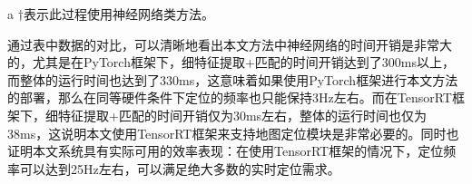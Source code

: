 \begin{table}
\centering
\begin{threeparttable}
\caption{地图定位模块的运行时间（毫秒）测试}
\label{tab:loc_efficiency}
\begin{tablenotes}
  \item [a] ${\dagger}$表示此过程使用神经网络类方法。
\end{tablenotes}
\end{threeparttable}
\end{table}

通过表中数据的对比，可以清晰地看出本文方法中神经网络的时间开销是非常大的，尤其是在PyTorch框架下，细特征提取+匹配的时间开销达到了300ms以上，而整体的运行时间也达到了330ms，这意味着如果使用PyTorch框架进行本文方法的部署，那么在同等硬件条件下定位的频率也只能保持3Hz左右。而在TensorRT框架下，细特征提取+匹配的时间开销仅为30ms左右，整体的运行时间也仅为38ms，这说明本文使用TensorRT框架来支持地图定位模块是非常必要的。同时也证明本文系统具有实际可用的效率表现：在使用TensorRT框架的情况下，定位频率可以达到25Hz左右，可以满足绝大多数的实时定位需求。

